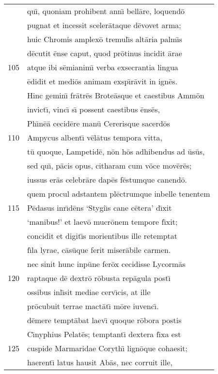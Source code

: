 \documentclass[paper=6in:9in,pagesize=pdftex,
               headinclude=on,footinclude=on,12pt]{scrbook}
\begin{document}
\begin{longtable}[p]{ r l }
 & qu\={\i}, quoniam prohibent ann\={\i} bell\=are, loquend\=o\\ 
 & pugnat et incessit sceler\=ataque d\=evovet arma;\\ 
 & huic Chromis amplex\=o tremul\={\i}s alt\=aria palm\={\i}s\\ 
 & d\=ecutit \=ense caput, quod pr\=otinus incidit \=arae\\ 
105 & atque ibi s\=emianim\={\i} verba exsecrantia lingua\\ 
 & \=edidit et medi\=os animam exsp\={\i}r\=avit in ign\=es.\\ 
 & \indent Hinc gemin\={\i} fr\=atr\=es Brote\=asque et caestibus Amm\=on\\ 
 & invict\={\i}, vinc\={\i} s\={\i} possent caestibus \=ens\=es,\\ 
 & Ph\={\i}n\=e\=a cecid\=ere man\=u Cererisque sacerd\=os\\ 
110 & Ampycus albent\={\i} v\=el\=atus tempora vitta,\\ 
 & t\=u quoque, Lampetid\=e, n\=on h\=os adhibendus ad \=us\=us,\\ 
 & sed qu\={\i}, p\=acis opus, citharam cum v\=oce mov\=er\=es;\\ 
 & iussus er\=as celebr\=are dap\=es f\=estumque canend\=o.\\ 
 & quem procul adstantem pl\=ectrumque inbelle tenentem\\ 
115 & P\=edasus inr\={\i}d\=ens `Stygi\={\i}s cane c\=etera' d\={\i}xit\\ 
 & `manibus!' et laev\=o mucr\=onem tempore f\={\i}xit;\\ 
 & concidit et digit\={\i}s morientibus ille retemptat\\ 
 & f\={\i}la lyrae, c\=as\=uque ferit miser\=abile carmen.\\ 
 & nec sinit hunc inp\=une fer\=ox cecidisse Lycorm\=as\\ 
120 & raptaque d\=e dextr\=o r\=obusta rep\=agula post\={\i}\\ 
 & ossibus inl\={\i}sit mediae cerv\={\i}cis, at ille\\ 
 & pr\=ocubuit terrae mact\=at\={\i} m\=ore iuvenc\={\i}.\\ 
 & d\=emere tempt\=abat laev\={\i} quoque r\=obora postis\\ 
 & C\={\i}nyphius Pelat\=es; temptant\={\i} dextera f\={\i}xa est\\ 
125 & cuspide Marmaridae Coryth\={\i} lign\=oque cohaesit;\\ 
 & haerent\={\i} latus hausit Ab\=as, nec corruit ille,\\ 

\end{longtable}
\end{document}
